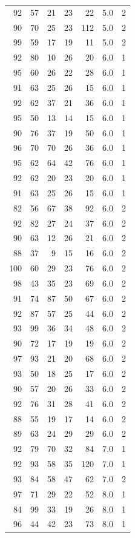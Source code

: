 \documentclass[
  11pt,
  a4paper,
]{scrartcl}
\begin{document}
\begin{longtable}[]{@{}rrrrrrl@{}}
92 & 57 & 21 & 23 & 22 & 5.0 & 2 \\
90 & 70 & 25 & 23 & 112 & 5.0 & 2 \\
99 & 59 & 17 & 19 & 11 & 5.0 & 2 \\
92 & 80 & 10 & 26 & 20 & 6.0 & 1 \\
95 & 60 & 26 & 22 & 28 & 6.0 & 1 \\
91 & 63 & 25 & 26 & 15 & 6.0 & 1 \\
92 & 62 & 37 & 21 & 36 & 6.0 & 1 \\
95 & 50 & 13 & 14 & 15 & 6.0 & 1 \\
90 & 76 & 37 & 19 & 50 & 6.0 & 1 \\
96 & 70 & 70 & 26 & 36 & 6.0 & 1 \\
95 & 62 & 64 & 42 & 76 & 6.0 & 1 \\
92 & 62 & 20 & 23 & 20 & 6.0 & 1 \\
91 & 63 & 25 & 26 & 15 & 6.0 & 1 \\
82 & 56 & 67 & 38 & 92 & 6.0 & 2 \\
92 & 82 & 27 & 24 & 37 & 6.0 & 2 \\
90 & 63 & 12 & 26 & 21 & 6.0 & 2 \\
88 & 37 & 9 & 15 & 16 & 6.0 & 2 \\
100 & 60 & 29 & 23 & 76 & 6.0 & 2 \\
98 & 43 & 35 & 23 & 69 & 6.0 & 2 \\
91 & 74 & 87 & 50 & 67 & 6.0 & 2 \\
92 & 87 & 57 & 25 & 44 & 6.0 & 2 \\
93 & 99 & 36 & 34 & 48 & 6.0 & 2 \\
90 & 72 & 17 & 19 & 19 & 6.0 & 2 \\
97 & 93 & 21 & 20 & 68 & 6.0 & 2 \\
93 & 50 & 18 & 25 & 17 & 6.0 & 2 \\
90 & 57 & 20 & 26 & 33 & 6.0 & 2 \\
92 & 76 & 31 & 28 & 41 & 6.0 & 2 \\
88 & 55 & 19 & 17 & 14 & 6.0 & 2 \\
89 & 63 & 24 & 29 & 29 & 6.0 & 2 \\
92 & 79 & 70 & 32 & 84 & 7.0 & 1 \\
92 & 93 & 58 & 35 & 120 & 7.0 & 1 \\
93 & 84 & 58 & 47 & 62 & 7.0 & 2 \\
97 & 71 & 29 & 22 & 52 & 8.0 & 1 \\
84 & 99 & 33 & 19 & 26 & 8.0 & 1 \\
96 & 44 & 42 & 23 & 73 & 8.0 & 1 \\

\end{longtable}
\end{document}
